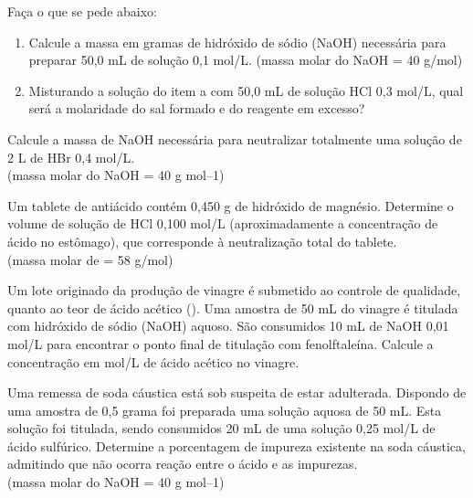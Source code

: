 \documentclass[a4paper,12]{exam}
\begin{document}
\begin{multicols}{2}
\begin{questions}
    \question Faça o que se pede abaixo:\\
    \begin{enumerate}[label=\Roman*-]
\item Calcule a massa em gramas de hidróxido de sódio (NaOH) necessária para preparar 50,0 mL de solução 0,1 mol/L. (massa molar do NaOH = 40 g/mol)
\item Misturando a solução do item a com 50,0 mL de solução HCl 0,3 mol/L, qual será a molaridade do sal formado e do reagente em excesso?
    \end{enumerate}
    \makeemptybox{2cm}


    \question Calcule a massa de NaOH necessária para neutralizar totalmente uma solução de 2 L de HBr 0,4 mol/L.\\ (massa molar do NaOH = 40 g mol–1)\makeemptybox{2cm}


    \question Um tablete de antiácido contém 0,450 g de hidróxido de magnésio. Determine o volume de solução de HCl 0,100 mol/L (aproximadamente a concentração de ácido no estômago), que corresponde à neutralização total do tablete. \\ (massa molar de  = 58 g/mol)
\makeemptybox{2cm}


    \question Um lote originado da produção de vinagre é submetido ao controle de qualidade, quanto ao teor de ácido acético (). Uma amostra de 50 mL do vinagre é titulada com hidróxido de sódio (NaOH) aquoso. São consumidos 10 mL de NaOH 0,01 mol/L para encontrar o ponto final de titulação com fenolftaleína. Calcule a concentração em mol/L de ácido acético no vinagre.
    \begin{center}
    \end{center}
   \makeemptybox{2cm}

    \question Uma remessa de soda cáustica está sob suspeita de estar adulterada. Dispondo de uma amostra de 0,5 grama foi preparada uma solução aquosa de 50 mL. Esta solução foi titulada, sendo consumidos 20 mL de uma solução 0,25 mol/L de ácido sulfúrico. Determine a porcentagem de impureza existente na soda cáustica, admitindo que não ocorra reação entre o ácido e as impurezas. \\ (massa molar do NaOH = 40 g mol–1)
\makeemptybox{2cm}

\end{questions}
\end{multicols}
\end{document}
